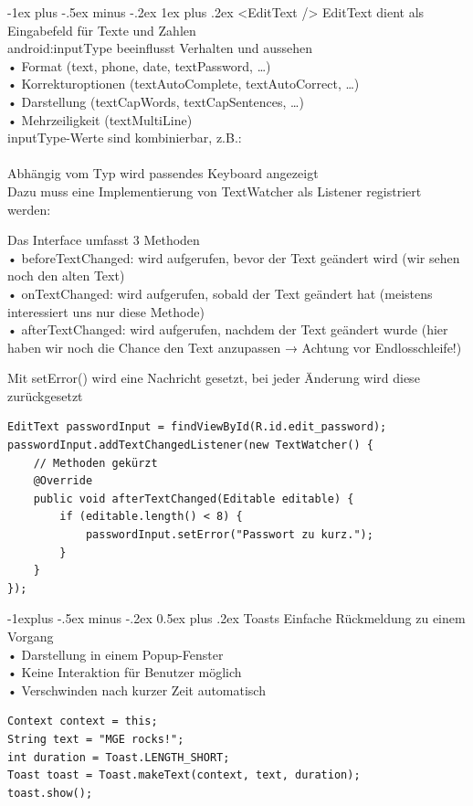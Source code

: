 \documentclass[10pt,landscape,a4paper]{article}
\makeatletter
\renewcommand{\subsection}{\@startsection{subsection}{2}{0mm}%
                                {-1explus -.5ex minus -.2ex}%
                                {0.5ex plus .2ex}%
                                {\normalfont\small\bfseries}}
\renewcommand{\subsubsection}{\@startsection{subsubsection}{3}{0mm}%
                                {-1ex plus -.5ex minus -.2ex}%
                                {1ex plus .2ex}%
                                {\normalfont\footnotesize\bfseries}}
\makeatother
\begin{document}
\begin{multicols*}{3}
\subsubsection{<EditText />}
EditText dient als Eingabefeld für Texte und Zahlen\\
android:inputType beeinflusst Verhalten und aussehen\\
• Format (text, phone, date, textPassword, …)\\
• Korrekturoptionen (textAutoComplete, textAutoCorrect, …)\\
• Darstellung (textCapWords, textCapSentences, …)\\
• Mehrzeiligkeit (textMultiLine)\\
inputType-Werte sind kombinierbar, z.B.:\\
\\
Abhängig vom Typ wird passendes Keyboard angezeigt\\

Dazu muss eine Implementierung von TextWatcher als Listener registriert werden:\\

Das Interface umfasst 3 Methoden\\
• beforeTextChanged: wird aufgerufen, bevor der Text geändert wird
(wir sehen noch den alten Text)\\
• onTextChanged: wird aufgerufen, sobald der Text geändert hat
(meistens interessiert uns nur diese Methode)\\
• afterTextChanged: wird aufgerufen, nachdem der Text geändert wurde
(hier haben wir noch die Chance den Text anzupassen → Achtung vor Endlosschleife!)

Mit setError() wird eine Nachricht gesetzt,
bei jeder Änderung wird diese zurückgesetzt
\begin{verbatim}
EditText passwordInput = findViewById(R.id.edit_password);
passwordInput.addTextChangedListener(new TextWatcher() {
    // Methoden gekürzt
    @Override
    public void afterTextChanged(Editable editable) {
        if (editable.length() < 8) {
            passwordInput.setError("Passwort zu kurz.");
        }
    }
});
\end{verbatim}
\subsection{Toasts}
Einfache Rückmeldung zu einem Vorgang\\
• Darstellung in einem Popup-Fenster\\
• Keine Interaktion für Benutzer möglich\\
• Verschwinden nach kurzer Zeit automatisch
\begin{verbatim}
Context context = this;
String text = "MGE rocks!";
int duration = Toast.LENGTH_SHORT;
Toast toast = Toast.makeText(context, text, duration);
toast.show();
\end{verbatim}

\end{multicols*}
\end{document}
